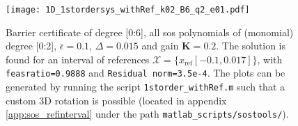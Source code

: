 \vspace{-2mm}
\begin{figure}[H]
\centering
\texttt{[image: 1D\_1stordersys\_withRef\_k02\_B6\_q2\_e01.pdf]}
\caption{Barrier certificate of degree [0:6], all \gls{sos} polynomials of (monomial) degree [0:2], $\bar{\epsilon}=0.1$, $\Delta=0.015$ and gain $\textbf{K}=0.2$. The solution is found for an interval of references $\mathcal{X}=\{x_\text{ref}[-0.1,0.017] \}$, with \texttt{feasratio=0.9888} and \texttt{Residual norm=3.5e-4}. The plots can be generated by running the script \texttt{1storder\_withRef.m} such that a custom 3D rotation is possible (located in appendix \ref{app:sos_refinterval} under the path \texttt{matlab\_scripts/sostools/}).}
\label{fig:1D_1stordersys_withRef_k02_B6_q2_e01}
\end{figure}




